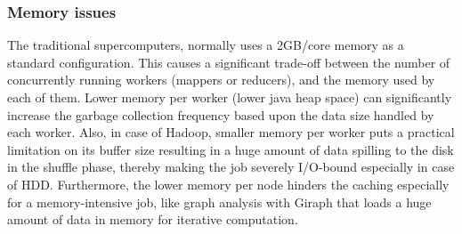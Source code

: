 \documentclass[conference]{IEEEtran}
\begin{document}
\subsubsection {Memory issues}
The traditional supercomputers, normally uses a 2GB/core memory as a standard configuration. 
This causes a significant trade-off between the number of concurrently running workers (mappers or reducers), and the memory used by each of them.
Lower memory per worker (lower java heap space) can significantly increase the garbage collection frequency based upon the data size handled by each worker.
Also, in case of Hadoop, smaller memory per worker puts a practical limitation on its buffer size resulting in a huge amount of data spilling to the disk in the shuffle phase, thereby making the job severely I/O-bound especially in case of HDD. 
Furthermore, the lower memory per node hinders the caching especially for a memory-intensive job, like graph analysis with Giraph that loads a huge amount of data in memory for iterative computation.

\end{document}
